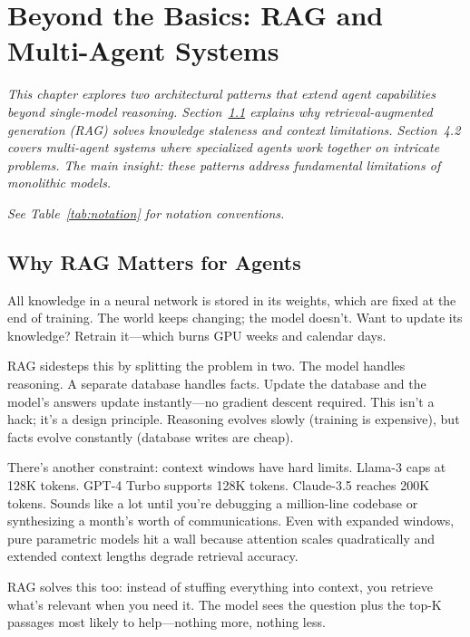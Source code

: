 \documentclass[12pt,a4paper]{report}
\theoremstyle{definition}
\begin{document}
\chapter{Beyond the Basics: RAG and Multi-Agent Systems}
\label{ch:advancedarch}

\textit{This chapter explores two architectural patterns that extend agent capabilities beyond single-model reasoning. Section~\ref{sec:rag-matters} explains why retrieval-augmented generation (RAG) solves knowledge staleness and context limitations. Section~4.2 covers multi-agent systems where specialized agents work together on intricate problems. The main insight: these patterns address fundamental limitations of monolithic models.
}

\vspace{0.3cm}
\noindent\textit{See Table~\ref{tab:notation} for notation conventions.}

\section{Why RAG Matters for Agents}
\label{sec:rag-matters}
All knowledge in a neural network is stored in its weights, which are fixed at the end of training. The world keeps changing; the model doesn't. Want to update its knowledge? Retrain it---which burns GPU weeks and calendar days.

RAG sidesteps this by splitting the problem in two. The model handles reasoning. A separate database handles facts. Update the database and the model's answers update instantly---no gradient descent required. This isn't a hack; it's a design principle. Reasoning evolves slowly (training is expensive), but facts evolve constantly (database writes are cheap).

There's another constraint: context windows have hard limits. Llama-3 caps at 128K tokens. GPT-4 Turbo supports 128K tokens. Claude-3.5 reaches 200K tokens. Sounds like a lot until you're debugging a million-line codebase or synthesizing a month's worth of communications. Even with expanded windows, pure parametric models hit a wall because attention scales quadratically and extended context lengths degrade retrieval accuracy.

RAG solves this too: instead of stuffing everything into context, you retrieve what's relevant when you need it. The model sees the question plus the top-K passages most likely to help---nothing more, nothing less.
\end{document}
